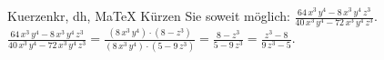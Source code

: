 \begin{MAufgabe}{Kuerzen}{kr, dh, MaTeX}
K\"urzen Sie soweit m\"oglich: $\frac{64\, x^3\, y^4 - 8\, x^3\, y^4\, z^3}{40\, x^3\, y^4 - 72\, x^3\, y^4\, z^3}$.\\ 
\ifLsg\MLoesung
\quad $\frac{64\, x^3\, y^4 - 8\, x^3\, y^4\, z^3}{40\, x^3\, y^4 - 72\, x^3\, y^4\, z^3}=\frac{(8\, x^3\, y^4)\cdot(8 - z^3)}{(8\, x^3\, y^4)\cdot(5 - 9\, z^3)}=\frac{8 - z^3}{5 - 9\, z^3}=\frac{z^3 - 8}{9\, z^3 - 5}$.\else\relax\fi
 \end{MAufgabe}